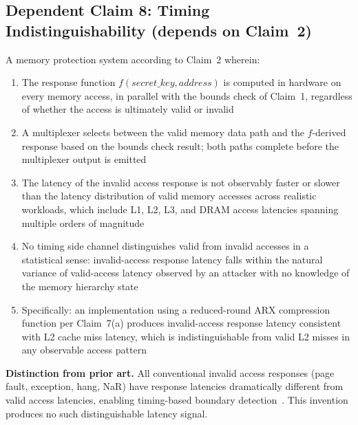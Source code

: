 \documentclass[12pt,letterpaper]{article}
\begin{document}
\medskip

\subsection*{Dependent Claim 8: Timing Indistinguishability
  (depends on Claim~2)}

A memory protection system according to Claim~2 wherein:

\begin{enumerate}[label=(\alph*),noitemsep]
  \item The response function $f(\textit{secret\_key}, \textit{address})$ is
        computed in hardware on every memory access, in parallel with the
        bounds check of Claim~1, regardless of whether the access is
        ultimately valid or invalid

  \item A multiplexer selects between the valid memory data path and the
        $f$-derived response based on the bounds check result; both
        paths complete before the multiplexer output is emitted

  \item The latency of the invalid access response is not observably faster
        or slower than the latency distribution of valid memory accesses
        across realistic workloads, which include L1, L2, L3, and DRAM
        access latencies spanning multiple orders of magnitude

  \item No timing side channel distinguishes valid from invalid accesses in
        a statistical sense: invalid-access response latency falls within
        the natural variance of valid-access latency observed by an attacker
        with no knowledge of the memory hierarchy state

  \item Specifically: an implementation using a reduced-round ARX compression
        function per Claim~7(a) produces invalid-access response latency
        consistent with L2 cache miss latency, which is indistinguishable
        from valid L2 misses in any observable access pattern
\end{enumerate}

\textbf{Distinction from prior art.}
All conventional invalid access responses (page fault, exception, hang,
NaR) have response latencies dramatically different from valid access
latencies, enabling timing-based boundary detection~\cite{hund_timing}.
This invention produces no such distinguishable latency signal.
\end{document}
